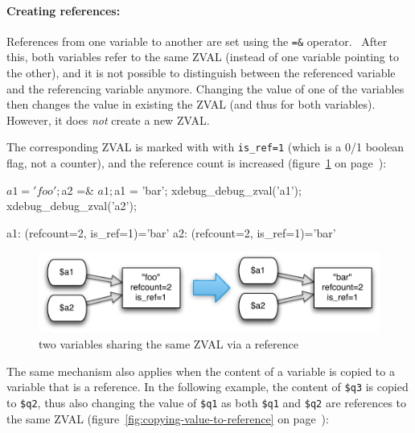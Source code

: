 \paragraph{Creating references:}

References from one variable to another are set using the \texttt{=\&} operator.~\cite[page 129]{wenz-php53}\cite{php-manual-what-references-do} After this, both variables refer to the same ZVAL (instead of one variable pointing to the other), and it is not possible to distinguish between the referenced variable and the referencing variable anymore. Changing the value of one of the variables then changes the value in existing the ZVAL (and thus for both variables). However, it does \emph{not} create a new ZVAL.

The corresponding ZVAL is marked with with \texttt{is\_ref=1} (which is a 0/1 boolean flag, not a counter), and the reference count is increased (figure~\ref{fig:simple-reference} on page~\pageref{fig:simple-reference}):

\begin{phpcode}
$a1 = 'foo';
$a2 =& $a1;
$a1 = 'bar';
xdebug_debug_zval('a1');
xdebug_debug_zval('a2');
\end{phpcode}

\begin{textcode}
a1: (refcount=2, is_ref=1)='bar'
a2: (refcount=2, is_ref=1)='bar'
\end{textcode}

\begin{figure}[!h]
  \begin{center}
    \includegraphics[scale=0.8]{images/a1_a2}
    \caption{two variables sharing the same ZVAL via a reference}
    \label{fig:simple-reference}
  \end{center}
\end{figure}


The same mechanism also applies when the content of a variable is copied to a variable that is a reference. In the following example, the content of \texttt{\$q3} is copied to \texttt{\$q2}, thus also changing the value of \texttt{\$q1} as both \texttt{\$q1} and \texttt{\$q2} are references to the same ZVAL (figure~\ref{fig:copying-value-to-reference} on page~\pageref{fig:copying-value-to-reference}):

